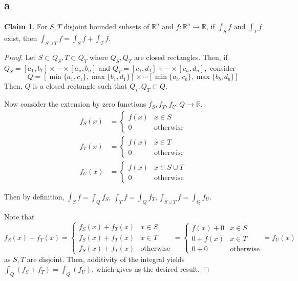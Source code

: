 \documentclass[12pt,letterpaper]{article}
\theoremstyle{definition}
\newtheorem*{claim}{Claim}
\newcommand{\R}{\mathbb{R}}
\begin{document}
\subsection*{a}

\begin{claim}
  For $S, T$ disjoint bounded subsets of $\R^n$ and $f: \R^n \rightarrow \R$, if
  $\int_Sf$ and $\int_T f$ exist, then $\int_{S \cup T}f = \int_Sf + \int_Tf$.
\end{claim}

\begin{proof}
  Let $S \subset Q_S, T \subset Q_T$ where $Q_S,Q_T$ are closed rectangles.
  Then, if $Q_S = [a_1, b_1] \times \cdots \times [a_n,b_n]$ and $Q_T =
  [c_1,d_1] \times \cdots \times [c_n,d_n],$ consider
  \[Q =
    [\min\{a_1,c_1\},\max\{b_1,d_1\}] \times \cdots
    [\min\{a_b,c_b\},\max\{b_b,d_b\}]
  \] Then, $Q$ is a closed rectangle such that
  $Q_s, Q_T \subset Q$.

  Now consider the extension by zero functions $f_S, f_T, f_U: Q \rightarrow \R$.
  \begin{align*}
    f_S(x) &=
             \begin{cases}
               f(x) & x \in S \\
               0 & \text{otherwise}
             \end{cases} \\
    f_T(x) &=
             \begin{cases}
               f(x) & x \in T \\
               0 & \text{otherwise}
             \end{cases} \\
    f_U(x) &=
             \begin{cases}
               f(x) & x \in S \cup T \\
               0 & \text{otherwise}
             \end{cases}
  \end{align*}

  Then by definition, $\int_Sf = \int_Qf_S$, $\int_Tf = \int_Qf_T, \int_{S\cup T}f =
  \int_Qf_U$.

  Note that
  \[
    f_S(x) + f_T(x) =
    \begin{cases}
      f_S(x) + f_T(x) & x \in S \\
      f_S(x) + f_T(x) & x \in T \\
      f_S(x) + f_T(x) & \text{otherwise}
    \end{cases} = 
    \begin{cases}
      f(x) + 0 & x \in S \\
      0 + f(x) & x \in T \\
      0 + 0 & \text{otherwise}
    \end{cases}
    = f_U(x)
  \]
  as $S, T$ are disjoint. Then, additivity of the integral yields $\int_Q(f_S + f_T) = \int_Q(f_U)$, which gives
  us the desired result.
\end{proof}
\end{document}
